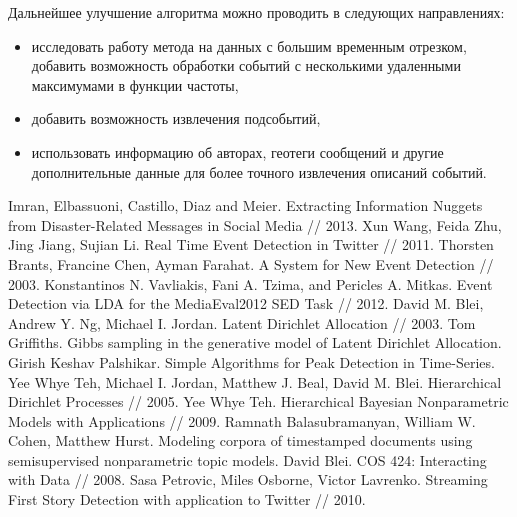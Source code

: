 \documentclass[12pt, a4paper]{article}
\begin{document}
		Дальнейшее улучшение алгоритма можно проводить в следующих направлениях:
	\begin{itemize}
	\item исследовать работу метода на данных с большим временным отрезком, добавить возможность обработки событий с несколькими удаленными максимумами в функции частоты,
	\item добавить возможность извлечения подсобытий,
	\item использовать информацию об авторах, геотеги сообщений и другие дополнительные данные для более точного извлечения описаний событий.
	\end{itemize}
	
  
\begin{thebibliography}{9}
	Imran, Elbassuoni, Castillo, Diaz and Meier. 
	Extracting Information Nuggets from Disaster-Related Messages in Social Media //
	2013.
	Xun Wang, Feida Zhu, Jing Jiang, Sujian Li.
	Real Time Event Detection in Twitter //
	2011.
	Thorsten Brants, Francine Chen, Ayman Farahat.
	A System for New Event Detection //
	2003.
	Konstantinos N. Vavliakis, Fani A. Tzima, and Pericles A. Mitkas.
	Event Detection via LDA for the MediaEval2012 SED Task //
	2012.
	David M. Blei, Andrew Y. Ng, Michael I. Jordan.
	Latent Dirichlet Allocation //
	2003.
	Tom Griffiths.
	Gibbs sampling in the generative model of Latent Dirichlet Allocation.
	Girish Keshav Palshikar.
	Simple Algorithms for Peak Detection in Time-Series.
	Yee Whye Teh, Michael I. Jordan, Matthew J. Beal, David M. Blei.
	Hierarchical Dirichlet Processes //
	2005.
	Yee Whye Teh.
	Hierarchical Bayesian Nonparametric Models with Applications //
	2009.
	Ramnath Balasubramanyan, William W. Cohen, Matthew Hurst.
	Modeling corpora of timestamped documents using semisupervised nonparametric topic models.
	 David Blei.
	 COS 424: Interacting with Data //
	 2008.
	 Sasa Petrovic, Miles Osborne, Victor Lavrenko.
	 Streaming First Story Detection with application to Twitter //
	 2010.
\end{thebibliography}

\end{document}
